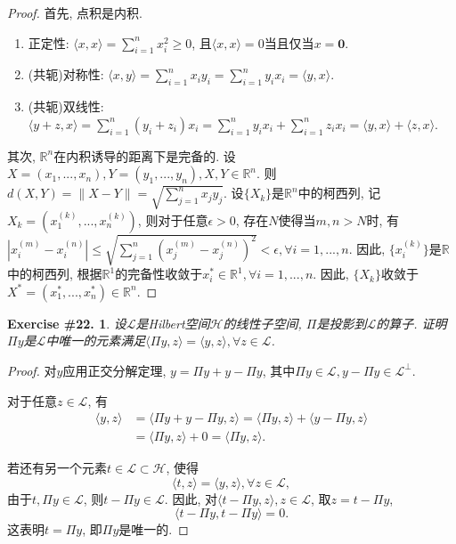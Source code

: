 \documentclass[UTF8, a4paper]{article}
\newtheorem{exercise}{Exercise \#22.}
\begin{document}
\begin{proof}
首先, 点积是内积. 
\begin{enumerate}
    \item 正定性: \(\langle x, x \rangle = \sum_{i=1}^{n}x_i^2 \geq 0\), 且\(\langle x, x \rangle = 0\)当且仅当\(x = \mathbf{0}\).
    \item (共轭)对称性: \(\langle x, y \rangle = \sum_{i=1}^{n}x_iy_i = \sum_{i=1}^{n}y_ix_i = \langle y, x \rangle\).
    \item (共轭)双线性: \(\langle  y + z, x \rangle = \sum_{i=1}^{n}(y_i + z_i)x_i = \sum_{i=1}^{n}y_ix_i + \sum_{i=1}^{n}z_ix_i = \langle  y, x \rangle + \langle z, x \rangle\).
\end{enumerate}

其次, \(\mathbb{R}^n\)在内积诱导的距离下是完备的.
设\(X = (x_1,...,x_n), Y = (y_1,...,y_n), X,Y \in \mathbb{R}^n\).
则\(d(X,Y) = {\|X - Y\|} = \sqrt{\sum_{j=1}^{n}x_j y_j}\).
设\(\{X_k\}\)是\(\mathbb{R}^n\)中的柯西列, 
记\(X_k = (x^{(k)}_1, ..., x^{(k)}_n)\), 
则对于任意\(\epsilon > 0\), 存在\(N\)使得当\(m,n > N\)时, 有\(|x^{(m)}_i - x^{(n)}_i| \leq \sqrt{\sum_{j=1}^{n}(x^{(m)}_j - x^{(n)}_j)^2} < \epsilon, \forall i = 1,..., n\).
因此, \(\{x^{(k)}_i\}\)是\(\mathbb{R}\)中的柯西列, 根据\(\mathbb{R}^1\)的完备性收敛于\(x_i^* \in \mathbb{R}^1, \forall i = 1,...,n\).
因此, \(\{X_k\}\)收敛于\(X^* = (x_1^*, ..., x_n^*) \in \mathbb{R}^n\).

\end{proof}


\begin{framed}
\begin{exercise}
设\(\mathcal{L}\)是Hilbert空间\(\mathcal{H}\)的线性子空间, \(\Pi\)是投影到\(\mathcal{L}\)的算子. 证明\(\Pi y\)是\(\mathcal{L}\)中唯一的元素满足\(\langle \Pi y, z\rangle = \langle y, z \rangle, \forall z \in \mathcal{L}\).
\end{exercise}
\end{framed}

\begin{proof}
对\(y\)应用正交分解定理, \(y = \Pi y + y - \Pi y\), 其中\(\Pi y \in \mathcal{L}, y - \Pi y \in \mathcal{L}^{\perp}\).

对于任意\(z \in \mathcal{L}\), 有
$$
\begin{aligned}
\langle y, z \rangle &= \langle \Pi y + y - \Pi y, z \rangle = \langle \Pi y, z \rangle + \langle y - \Pi y, z \rangle \\
&= \langle \Pi y, z \rangle + 0 = \langle \Pi y, z \rangle.
\end{aligned}
$$

若还有另一个元素\(t\in \mathcal{L} \subset \mathcal{H}\), 使得 
$$
\langle t, z \rangle = \langle y, z \rangle, \forall z \in \mathcal{L},
$$
由于\(t, \Pi y \in \mathcal{L}\), 则\(t - \Pi y \in \mathcal{L}\).
因此, 对\(\langle t - \Pi y, z\rangle, z\in \mathcal{L}\), 取\(z = t - \Pi y\), 
$$
\langle t - \Pi y, t - \Pi y \rangle = 0.
$$
这表明\(t = \Pi y\), 即\(\Pi y\)是唯一的.
\end{proof}



\end{document}
